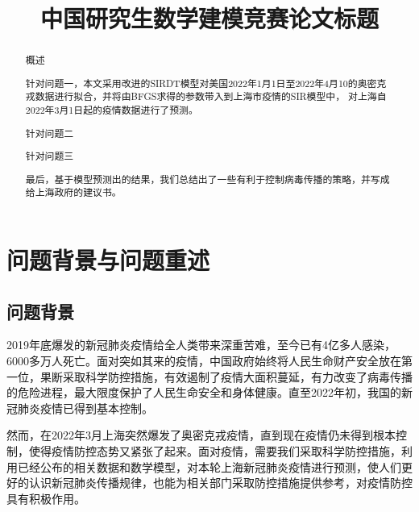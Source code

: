 \documentclass[bwprint]{gmcmthesis}
\title{中国研究生数学建模竞赛论文标题}
\numberwithin{figure}{section}
\begin{document}
 \maketitle
 \begin{abstract}
概述
\par 针对问题一，本文采用改进的SIRDT模型对美国2022年1月1日至2022年4月10的奥密克戎数据进行拟合，并将由BFGS求得的参数带入到上海市疫情的SIR模型中，
对上海自2022年3月1日起的疫情数据进行了预测。
\par 针对问题二
\par 针对问题三
\par 最后，基于模型预测出的结果，我们总结出了一些有利于控制病毒传播的策略，并写成给上海政府的建议书。



\end{abstract}


\tableofcontents

\section{问题背景与问题重述}
\subsection{问题背景}
2019年底爆发的新冠肺炎疫情给全人类带来深重苦难，至今已有4亿多人感染，6000多万人死亡。面对突如其来的疫情，中国政府始终将人民生命财产安全放在第一位，果断采取科学防控措施，有效遏制了疫情大面积蔓延，有力改变了病毒传播的危险进程，最大限度保护了人民生命安全和身体健康。直至2022年初，我国的新冠肺炎疫情已得到基本控制。
\par 然而，在2022年3月上海突然爆发了奥密克戎疫情，直到现在疫情仍未得到根本控制，使得疫情防控态势又紧张了起来。面对疫情，需要我们采取科学防控措施，利用已经公布的相关数据和数学模型，对本轮上海新冠肺炎疫情进行预测，使人们更好的认识新冠肺炎传播规律，也能为相关部门采取防控措施提供参考，对疫情防控具有积极作用。
\end{document}
